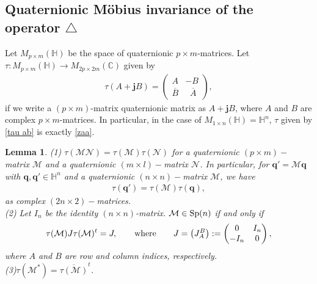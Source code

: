 \documentclass[a4paper,11pt]{amsart}
\numberwithin{equation}{section}
\newtheorem{lem}{Lemma}[section]
\begin{document}
\subsection{Quaternionic M\"{o}bius invariance of the operator $\triangle$}
Let $M_{p\times m}(\mathbb{H})$ be the space of quaternionic $p\times m$-matrices. Let $\tau:M_{p\times m}(\mathbb{H})\rightarrow M_{2p\times 2m}(\mathbb{C})$ given by
\begin{equation}\begin{aligned}\label{tau ab}
\tau(A+\mathbf{j}B)=\left(\begin{matrix}A&-B\\\overline{B}&\;\;\overline{A}
\end{matrix}\right),
\end{aligned}\end{equation}
if we write a $(p\times m)$-matrix quaternionic matrix as $A+\mathbf{j}B$, where $A$ and $B$ are complex $p\times m$-matrices. In particular, in the case of $M_{1\times n}(\mathbb{H})=\mathbb{H}^n$, $\tau$ given by \eqref{tau ab} is exactly \eqref{zaa}.
\begin{lem}\cite[Proposition 2.3]{wang2}\label{tau MN}
(1) $\tau(\mathcal{M}\mathcal{N})=\tau(\mathcal{M})\tau(\mathcal{N})$ for a quaternionic $(p\times m)-$matrix $\mathcal{M}$ and a quaternionic $(m\times l)-$matrix $\mathcal{N}$. In particular, for $\mathbf{q}'=\mathcal{M}\mathbf{q}$ with $\mathbf{q},\mathbf{q}'\in \mathbb{H}^n$ and a quaternionic $(n\times n)-$matrix $\mathcal{M}$, we have
\begin{equation*}\begin{aligned}
\tau(\mathbf{q}')=\tau(\mathcal{M})\tau(\mathbf{q}),
\end{aligned}\end{equation*}
as complex $(2n\times 2)-$matrices.\\
(2)\; Let $I_n$ be the identity $(n\times n)$-matrix. $\mathcal{M}\in {\rm Sp}(n)$ if and only if
\begin{equation}\begin{aligned}\label{def J}
\tau(\mathcal{M})J\tau(\mathcal{M})^t=J,\qquad{\rm where}\qquad J=\left(J_A^B\right):=\left(\begin{matrix}0&I_n\\-I_n&0\end{matrix}\right),
\end{aligned}\end{equation}
where $A$ and $B$ are row and column indices, respectively.\\
(3)\;$\tau(\mathcal{M}^*)=\overline{\tau(\mathcal{M})}^t$.
\end{lem}
\end{document}
